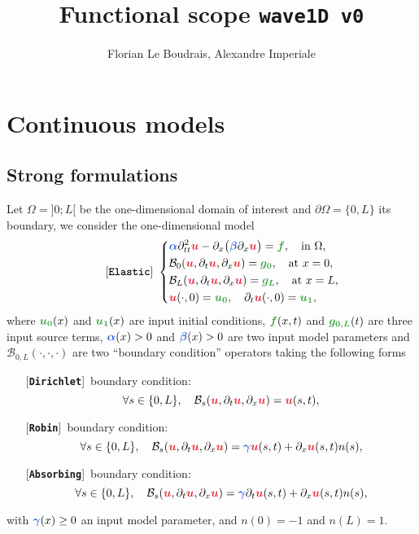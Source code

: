 \documentclass[11pt,a4paper]{article}
\title{Functional scope \texttt{wave1D v0}}
\author[1]{Florian Le Boudrais, Alexandre Imperiale}
\newcommand{\unknown}[1]{\bm{{\color{myred}{#1}}}}
\newcommand{\param}[1]{\bm{{\color{myhyperblue}{#1}}}}
\newcommand{\data}[1]{\bm{{\color{mygreen}{#1}}}}
\newcommand{\keyword}[1]{[\texttt{\textbf{#1}}]\!\,}
\begin{document}
% 

\maketitle

\section{Continuous models}
\subsection{Strong formulations}
Let $\Omega = ]0; L[$ be the one-dimensional domain of interest and $\partial\Omega = \{0, L\}$ its boundary, we consider the one-dimensional model
\begin{equation*}
\quad \quad
\keyword{Elastic}~
\left\lbrace
\begin{aligned}
& \param{\alpha}\partial^2_{tt} \unknown{u} - \partial_x\big( \param{\beta} \partial_x \unknown{u} \big) = \data{f},\quad \text{in }\Omega,\\
& \mathcal{B}_0(\unknown{u}, \partial_t \unknown{u}, \partial_x \unknown{u}) = \data{g_0},\quad \text{at } x = 0,\\
&\mathcal{B}_L(\unknown{u}, \partial_t \unknown{u}, \partial_x \unknown{u}) = \data{g_L},\quad \text{at } x = L,\\
& \unknown{u}(\cdot, 0) = \data{u_0},\quad \partial_t\unknown{u}(\cdot, 0) = \data{u_1},
\end{aligned}
\right.
\end{equation*}
where $\data{u_0}(x)$ and $\data{u_1}(x)$ are input initial conditions, $\data{f}(x, t)$ and $\data{g_{0,L}}(t)$ are three input source terms, $\param{\alpha}(x) > 0$ and $\param{\beta}(x) > 0$ are two input model parameters and $\mathcal{B}_{0, L}(\cdot, \cdot, \cdot)$ are two ``boundary condition'' operators taking the following forms
\begin{itemize}
\item[] \keyword{Dirichlet} boundary condition: 
\begin{equation*}
\forall s \in\{0, L\},\quad \mathcal{B}_s(\unknown{u}, \partial_t \unknown{u}, \partial_x \unknown{u}) = \unknown{u}(s, t),
\end{equation*}
\item[] \keyword{Robin} boundary condition: 
\begin{equation*}
\forall s \in\{0, L\},\quad \mathcal{B}_s(\unknown{u}, \partial_t \unknown{u}, \partial_x \unknown{u}) = \param{\gamma}\unknown{u}(s, t) + \partial_x \unknown{u}(s, t) n(s),
\end{equation*}
\item[] \keyword{Absorbing} boundary condition:
\begin{equation*}
\forall s \in\{0, L\},\quad \mathcal{B}_s(\unknown{u}, \partial_t \unknown{u}, \partial_x \unknown{u}) = \param{\gamma} \partial_t \unknown{u}(s, t) + \partial_x \unknown{u}(s, t) n(s),
\end{equation*}
\end{itemize}
with $\param{\gamma}(x) \geq 0$ an input model parameter, and $n(0) = -1$ and $n(L) = 1$.
\end{document}
